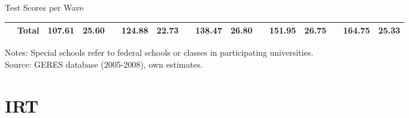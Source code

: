 \documentclass{beamer}
\begin{document}
\begin{frame}[label=ScoresWave]{Test Scores per Wave}
\begin{table}[H]
\begin{adjustbox}{width=1\textwidth}
\begin{tabular}{llllllllllllllll}
\cmidrule{2-16}          & \textbf{Total} & \multicolumn{1}{c}{\textbf{107.61}} & \multicolumn{1}{c}{\textbf{25.60}} &       & \multicolumn{1}{c}{\textbf{124.88}} & \multicolumn{1}{c}{\textbf{22.73}} &       & \multicolumn{1}{c}{\textbf{138.47}} & \multicolumn{1}{c}{\textbf{26.80}} &       & \multicolumn{1}{c}{\textbf{151.95}} & \multicolumn{1}{c}{\textbf{26.75}} &       & \multicolumn{1}{c}{\textbf{164.75}} & \multicolumn{1}{c}{\textbf{25.33}} \\
    \bottomrule
     \end{tabular}%
 \end{adjustbox}
\begin{minipage}{1\textwidth} 
{\tiny
Notes: Special schools refer to federal schools or classes in participating universities. \\ Source: GERES database (2005-2008), own estimates.\par}
\end{minipage}
\end{table}%
\end{frame}










\section{IRT}
\end{document}
